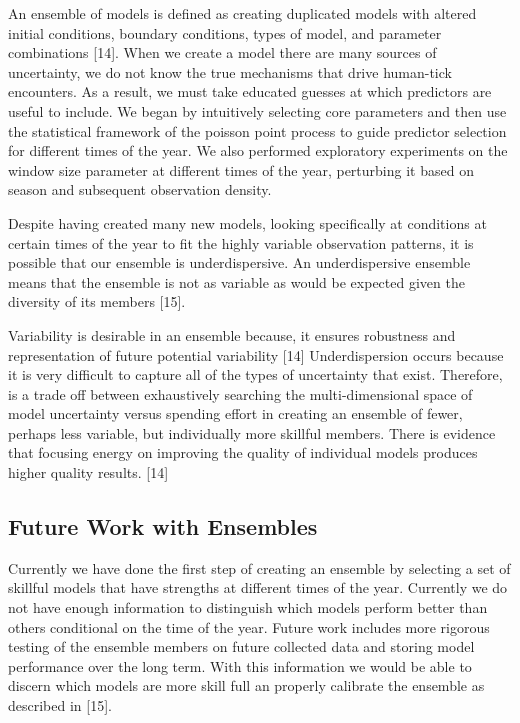 \noindent An ensemble of models is defined as creating duplicated models with altered initial conditions, boundary conditions, types of model, and parameter combinations [14]. When we create a model there are many sources of uncertainty, we do not know the true mechanisms that drive human-tick encounters. As a result, we must take educated guesses at which predictors are useful to include. We began by intuitively selecting core parameters and then use the statistical framework of the poisson point process to guide predictor selection for different times of the year.  We also performed exploratory experiments on the window size parameter at different times of the year, perturbing it based on season and subsequent observation density.  \newline

\noindent Despite having created many new models, looking specifically at conditions at certain times of the year to fit the highly variable observation patterns, it is possible that our ensemble is underdispersive. An underdispersive ensemble means that the ensemble is not as variable as would be expected given the diversity of its members [15]. \newline

\noindent Variability is desirable in an ensemble because, it ensures robustness and representation of future potential variability [14] Underdispersion occurs because it is very difficult to capture all of the types of uncertainty that exist. Therefore, is a trade off between exhaustively searching the multi-dimensional space of model uncertainty versus spending effort in creating an ensemble of fewer, perhaps less variable, but individually more skillful members. There is evidence that focusing energy on improving the quality of individual models produces higher quality results. [14]


\subsection{Future Work with Ensembles}
 
Currently we have done the first step of creating an ensemble by selecting a set of skillful models that have strengths at different times of the year. Currently we do not have enough information to distinguish which models perform better than others conditional on the time of the year. Future work includes more rigorous testing of the ensemble members on future collected data and storing model performance over the long term. With this information we would be able to discern which models are more skill full an properly calibrate the ensemble as described in [15]. 


